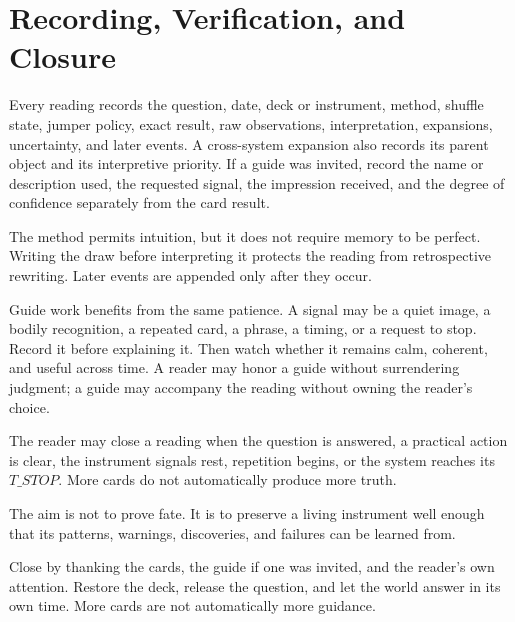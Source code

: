 \chapter{Recording, Verification, and Closure}

Every reading records the question, date, deck or instrument, method, shuffle
state, jumper policy, exact result, raw observations, interpretation, expansions,
uncertainty, and later events. A cross-system expansion also records its parent
object and its interpretive priority. If a guide was invited, record the name or
description used, the requested signal, the impression received, and the degree
of confidence separately from the card result.

The method permits intuition, but it does not require memory to be perfect.
Writing the draw before interpreting it protects the reading from retrospective
rewriting. Later events are appended only after they occur.

Guide work benefits from the same patience. A signal may be a quiet image, a
bodily recognition, a repeated card, a phrase, a timing, or a request to stop.
Record it before explaining it. Then watch whether it remains calm, coherent,
and useful across time. A reader may honor a guide without surrendering
judgment; a guide may accompany the reading without owning the reader's choice.

The reader may close a reading when the question is answered, a practical action
is clear, the instrument signals rest, repetition begins, or the system reaches
its $T\_STOP$. More cards do not automatically produce more truth.

The aim is not to prove fate. It is to preserve a living instrument well enough
that its patterns, warnings, discoveries, and failures can be learned from.

Close by thanking the cards, the guide if one was invited, and the reader's own
attention. Restore the deck, release the question, and let the world answer in
its own time. More cards are not automatically more guidance.
